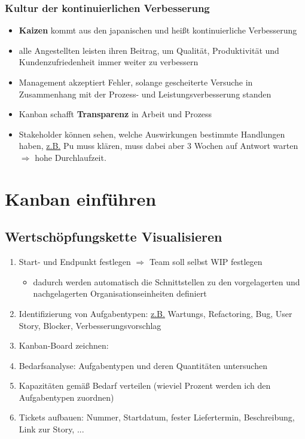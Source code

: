 \subsubsection{Kultur der kontinuierlichen Verbesserung}
\begin{itemize}
  \item \textbf{Kaizen} kommt aus den japanischen und heißt kontinuierliche Verbesserung
  \item alle Angestellten leisten ihren Beitrag, um Qualität, Produktivität und Kundenzufriedenheit
    immer weiter zu verbessern
  \item Management akzeptiert Fehler, solange gescheiterte Versuche in Zusammenhang mit der
    Prozess- und Leistungsverbesserung standen
  \item Kanban schafft \textbf{Transparenz} in Arbeit und Prozess
  \item Stakeholder können sehen, welche Auswirkungen bestimmte Handlungen haben, \uline{z.B.} Pu
    muss klären, muss dabei aber 3 Wochen auf Antwort warten $\Rightarrow$  hohe Durchlaufzeit.
\end{itemize}


\section{Kanban einführen}
\subsection{Wertschöpfungskette Visualisieren}
\begin{enumerate}
  \item Start- und Endpunkt festlegen $\Rightarrow$ Team soll selbst WIP festlegen
    \begin{itemize}
      \item dadurch werden automatisch die Schnittstellen zu den vorgelagerten und nachgelagerten
        Organisationseinheiten definiert
    \end{itemize}
  \item Identifizierung von Aufgabentypen: \uline{z.B.} Wartungs, Refactoring, Bug, User Story,
    Blocker, Verbesserungsvorschlag
  \item Kanban-Board zeichnen:
  \item Bedarfsanalyse: Aufgabentypen und deren Quantitäten untersuchen
  \item Kapazitäten gemäß Bedarf verteilen (wieviel Prozent werden ich den Aufgabentypen zuordnen)
  \item Tickets aufbauen: Nummer, Startdatum, fester Liefertermin, Beschreibung, Link zur Story, ...
\end{enumerate}



